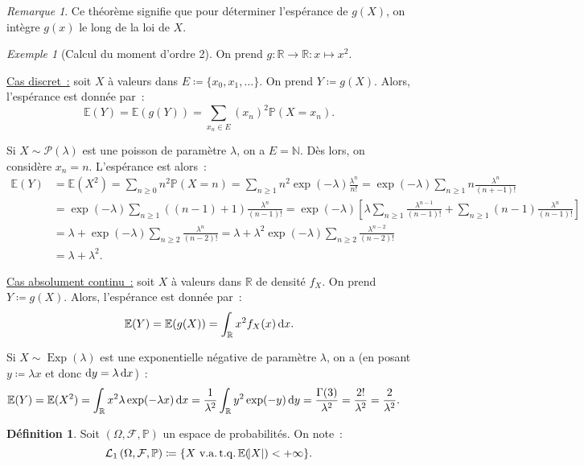 \documentclass{article}
\newcommand{\E}{\mathbb E}
\newcommand{\N}{\mathbb N}
\renewcommand{\P}{\mathbb P}
\newcommand{\R}{\mathbb R}
\newcommand{\espproba}[3]{\left(#1, #2, #3\right)}  %
\newcommand{\Ofp}{\espproba \Omega{\mathcal F}\P}  %
\newcommand{\Lu}{\mathcal L_1\Ofp}  %
\DeclareMathOperator{\tq}{t.q.}
\DeclareMathOperator{\Exp}{Exp}
\theoremstyle{definition}
\newtheorem{déf}[thm]{Définition}
\theoremstyle{remark}
\newtheorem*{rmq}{Remarque}
\newtheorem{ex}{Exemple}
\begin{document}
		\begin{rmq} Ce théorème signifie que pour déterminer l'espérance de $g(X)$, on intègre $g(x)$ le long de la loi de $X$. \end{rmq}

		\begin{ex}[Calcul du moment d'ordre 2] On prend $g : \R \to \R : x \mapsto x^2$.

		\underline{Cas discret~:} soit $X$ à valeurs dans $E \coloneqq \{x_0, x_1, \ldots\}$. On prend $Y \coloneqq g(X)$. Alors, l'espérance est donnée par~:
		\[\E(Y) = \E(g(Y)) = \sum_{x_n \in E}(x_n)^2\P(X = x_n).\]

		Si $X \sim \mathcal P(\lambda)$ est une poisson de paramètre $\lambda$, on a $E = \N$. Dès lors, on considère $x_n = n$. L'espérance est alors~:
		\begin{align*}
			\E(Y) &= \E(X^2) = \sum_{n \geq 0} n^2\P(X = n) = \sum_{n \geq 1}n^2\exp(-\lambda)\frac {\lambda^n}{n!} = \exp(-\lambda)\sum_{n \geq 1}n\frac {\lambda^n}{(n+-1)!} \\
			      &= \exp(-\lambda)\sum_{n \geq 1}\left((n-1) + 1\right)\frac {\lambda^n}{(n-1)!}
				  = \exp(-\lambda)\left[\lambda\sum_{n \geq 1}\frac {\lambda^{n-1}}{(n-1)!} + \sum_{n \geq 1}(n-1)\frac {\lambda^n}{(n-1)!}\right] \\
				  &= \lambda + \exp(-\lambda)\sum_{n \geq 2}\frac {\lambda^n}{(n-2)!} = \lambda + \lambda^2\exp(-\lambda)\sum_{n \geq 2}\frac {\lambda^{n-2}}{(n-2)!} \\
				  &= \lambda + \lambda^2.
		\end{align*}

		\underline{Cas absolument continu~:} soit $X$ à valeurs dans $\R$ de densité $f_X$. On prend $Y \coloneqq g(X)$. Alors, l'espérance est donnée par~:
		\[\E(Y) = \E(g(X)) = \int_\R x^2f_X(x)\dif x.\]

		Si $X \sim \Exp(\lambda)$ est une exponentielle négative de paramètre $\lambda$, on a (en posant $y \coloneqq \lambda x$ et donc
		$\dif y = \lambda \dif x$)~:
		\begin{align*}
			\E(Y) &= \E(X^2) = \int_\R x^2\lambda\exp(-\lambda x)\dif x = \frac 1{\lambda^2}\int_\R y^2\exp(-y)\dif y = \frac {\Gamma(3)}{\lambda^2}
			      = \frac {2!}{\lambda^2}  = \frac 2{\lambda^2}.
		\end{align*}
		\end{ex}

		\begin{déf} Soit $\Ofp$ un espace de probabilités. On note~:
		\begin{equation}
			\Lu \coloneqq \{X \text{ v.a.} \tq \E(\abs X) < +\infty\}.
		\end{equation}
		\end{déf}
\end{document}
